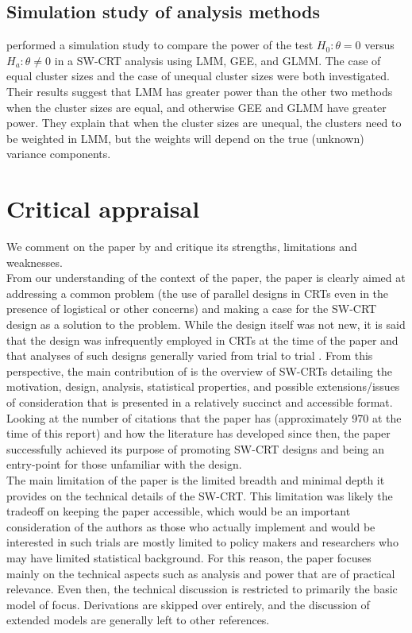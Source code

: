 \documentclass[10pt]{article}
\begin{document}
\subsection{Simulation study of analysis methods}

\textcite{Hussey:2007} performed a simulation study to compare the power of the test $H_0:\theta=0$ versus $H_a:\theta\neq0$ in a SW-CRT analysis using LMM, GEE, and GLMM. The case of equal cluster sizes and the case of unequal cluster sizes were both investigated. Their results suggest that LMM has greater power than the other two methods when the cluster sizes are equal, and otherwise GEE and GLMM have greater power. They explain that when the cluster sizes are unequal, the clusters need to be weighted in LMM, but the weights will depend on the true (unknown) variance components.


\section{Critical appraisal} \label{sec:critique}

We comment on the paper by \textcite{Hussey:2007} and critique its strengths, limitations and weaknesses.
\\

From our understanding of the context of the paper, the paper is clearly aimed at addressing a common problem (the use of parallel designs in CRTs even in the presence of logistical or other concerns) and making a case for the SW-CRT design as a solution to the problem. While the design itself was not new, it is said that the design was infrequently employed in CRTs at the time of the paper and that analyses of such designs generally varied from trial to trial \parencite{Brown:2006}. From this perspective, the main contribution of \citeauthor{Hussey:2007} is the overview of SW-CRTs detailing the motivation, design, analysis, statistical properties, and possible extensions/issues of consideration that is presented in a relatively succinct and accessible format. Looking at the number of citations that the paper has (approximately 970 at the time of this report) and how the literature has developed since then, the paper successfully achieved its purpose of promoting SW-CRT designs and being an entry-point for those unfamiliar with the design.
\\

The main limitation of the paper is the limited breadth and minimal depth it provides on the technical details of the SW-CRT. This limitation was likely the tradeoff on keeping the paper accessible, which would be an important consideration of the authors as those who actually implement and would be interested in such trials are mostly limited to policy makers and researchers who may have limited statistical background. For this reason, the paper focuses mainly on the technical aspects such as analysis and power that are of practical relevance. Even then, the technical discussion is restricted to primarily the basic model of focus. Derivations are skipped over entirely, and the discussion of extended models are generally left to other references.
\\
\end{document}
